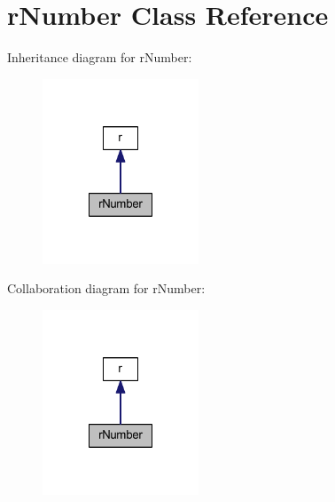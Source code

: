 \hypertarget{class_pierce_moore_1_1_ruby_p_h_p_1_1r_number}{\section{r\-Number Class Reference}
\label{class_pierce_moore_1_1_ruby_p_h_p_1_1r_number}
}


Inheritance diagram for r\-Number\-:
\nopagebreak
\begin{figure}[H]
\begin{center}
\leavevmode
\includegraphics[width=132pt]{class_pierce_moore_1_1_ruby_p_h_p_1_1r_number__inherit__graph}
\end{center}
\end{figure}


Collaboration diagram for r\-Number\-:
\nopagebreak
\begin{figure}[H]
\begin{center}
\leavevmode
\includegraphics[width=132pt]{class_pierce_moore_1_1_ruby_p_h_p_1_1r_number__coll__graph}
\end{center}
\end{figure}
